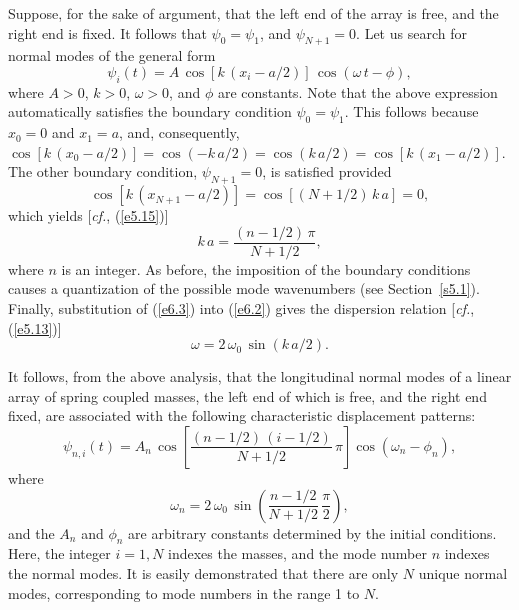 Suppose, for the sake of argument, that the left end of the array is
free, and the right end is fixed. It follows that $\psi_0=\psi_1$, and 
$\psi_{N+1}=0$. 
Let us search for  normal
modes of the general form
\begin{equation}\label{e6.3}
\psi_i(t) = A\,\cos[k\,(x_i-a/2)]\,\cos(\omega\,t-\phi),
\end{equation}
where $A>0$, $k>0$, $\omega>0$, and $\phi$ are constants. 
Note that the above expression automatically satisfies the  boundary condition $\psi_0=\psi_1$. This follows because
$x_0=0$ and $x_1=a$, and, consequently, $\cos[k\,(x_0-a/2)]=\cos(-k\,a/2)=\cos(k\,a/2)=\cos[k\,(x_1-a/2)]$. The other boundary condition, $\psi_{N+1}=0$,  is satisfied provided
\begin{equation}
\cos[k\,(x_{N+1}-a/2)] = \cos[(N+1/2)\,k\,a] = 0,
\end{equation}
which yields [{\em cf.}, (\ref{e5.15})]
\begin{equation}\label{e6.5}
k\,a = \frac{(n-1/2)\,\pi}{N+1/2},
\end{equation}
where $n$ is an integer. As before, the imposition of the boundary conditions
causes a quantization of the  possible mode wavenumbers (see Section~\ref{s5.1}). 
 Finally, substitution of (\ref{e6.3}) into (\ref{e6.2}) gives the
dispersion relation [{\em cf.}, (\ref{e5.13})]
\begin{equation}\label{e6.6}
\omega = 2\,\omega_0\,\sin(k\,a/2).
\end{equation}

It follows, from the above analysis,  that the longitudinal normal modes  of a linear array of spring coupled masses, the left end of which is free, and the right end fixed, are associated with  the following characteristic displacement patterns:
\begin{equation}\label{e6.7}
\psi_{n,i} (t) = A_n\,\cos\left[\frac{(n-1/2)\,(i-1/2)}{N+1/2}\,\pi\right]\cos(\omega_n-\phi_n),
\end{equation}
where
\begin{equation}\label{e6.8}
\omega_n = 2\,\omega_0\,\sin\left(\frac{n-1/2}{N+1/2}\,\frac{\pi}{2}\right),
\end{equation}
and the $A_n$ and $\phi_n$ are arbitrary constants determined by the initial conditions.
Here, the integer $i=1,N$ indexes the masses, and the mode number $n$ indexes the normal modes. It is easily
demonstrated that there are only $N$ unique normal
modes, corresponding to mode numbers in the range 1 to $N$. 

